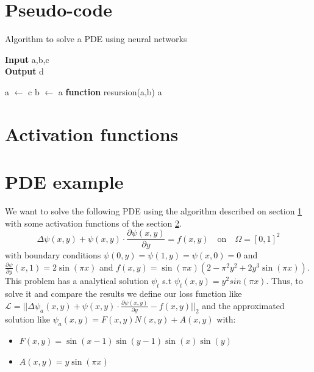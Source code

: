 \newpage
\section{Pseudo-code}
\label{pseudo_code}
\begin{algorithm}[H]
    \caption*{Algorithm to solve a PDE using neural networks}
    \hspace*{\algorithmicindent} \textbf{Input} a,b,c\\
    \hspace*{\algorithmicindent} \textbf{Output} d
    \begin{algorithmic}
    \STATE a $\leftarrow$ c
    \STATE b $\leftarrow$ a
    \STATE \textbf{function} \quad resursion(a,b)
        \bindent
        \RETURN a
        \eindent
    \end{algorithmic}
    \end{algorithm}

\section{Activation functions}
\label{activation}

\newpage
\section{PDE example}
\label{pde_example}
We want to solve the following PDE using the algorithm described on section \ref{pseudo_code} with some activation functions of the section \ref{activation}.
\begin{equation}
    \Delta \psi(x,y) +\psi(x,y)\cdot\frac{\partial \psi(x,y)}{\partial y}= f(x,y) \quad\text{on}\quad \Omega = [0,1]^2  
\end{equation}
with boundary conditions $\psi(0,y)=\psi(1,y)=\psi(x,0)=0$ and $\frac{\partial \psi}{\partial y}(x,1)=2\sin(\pi x)$           
and $f(x, y)=\sin(\pi x)(2-\pi^2y^2+2y^3\sin(\pi x))$. 
\newline
This problem has a analytical solution $\psi_t$ s.t $\psi_t(x, y)=y^2sin(\pi x)$. Thus, to solve it and compare the results we define our loss function like $\mathcal{L} = ||\Delta \psi_a(x,y) +\psi(x,y)\cdot\frac{\partial \psi(x,y)}{\partial y}-f(x,y) ||_2$  
and the approximated solution like $\psi_a(x,y)=F(x,y)N(x,y)+A(x,y)$ with:
\begin{itemize}
    \item $F(x,y)=\sin(x-1)\sin(y-1)\sin(x)\sin(y)$
    \item $A(x,y)=y\sin(\pi x)$        
\end{itemize}

